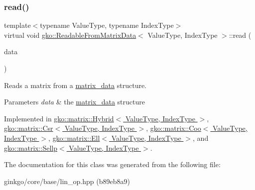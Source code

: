 \subsubsection{\texorpdfstring{read()}{read()}}
{\footnotesize\ttfamily template$<$typename Value\+Type, typename Index\+Type$>$ \\
virtual void \hyperlink{classgko_1_1ReadableFromMatrixData}{gko\+::\+Readable\+From\+Matrix\+Data}$<$ Value\+Type, Index\+Type $>$\+::read (\begin{DoxyParamCaption}\item[{const \hyperlink{structgko_1_1matrix__data}{matrix\+\_\+data}$<$ Value\+Type, Index\+Type $>$ \&}]{data }\end{DoxyParamCaption})\hspace{0.3cm}{\ttfamily [pure virtual]}}



Reads a matrix from a \hyperlink{structgko_1_1matrix__data}{matrix\+\_\+data} structure. 


\begin{DoxyParams}{Parameters}
{\em data} & the \hyperlink{structgko_1_1matrix__data}{matrix\+\_\+data} structure \\
\hline
\end{DoxyParams}


Implemented in \hyperlink{classgko_1_1matrix_1_1Hybrid_a7eff2922ae21e9722b343ca1832d8bf5}{gko\+::matrix\+::\+Hybrid$<$ Value\+Type, Index\+Type $>$}, \hyperlink{classgko_1_1matrix_1_1Csr_ac4db41146ed3c3a8653b03d6b2c6c675}{gko\+::matrix\+::\+Csr$<$ Value\+Type, Index\+Type $>$}, \hyperlink{classgko_1_1matrix_1_1Coo_ac0d4aeb19d9f55b62bea18bad1a408f5}{gko\+::matrix\+::\+Coo$<$ Value\+Type, Index\+Type $>$}, \hyperlink{classgko_1_1matrix_1_1Ell_a2c877d9f7bbc57f97df5ab443954a6fd}{gko\+::matrix\+::\+Ell$<$ Value\+Type, Index\+Type $>$}, and \hyperlink{classgko_1_1matrix_1_1Sellp_a2c5ff4a3f190daf7d70bbd8451d13edd}{gko\+::matrix\+::\+Sellp$<$ Value\+Type, Index\+Type $>$}.



The documentation for this class was generated from the following file\+:\begin{DoxyCompactItemize}
\item 
ginkgo/core/base/lin\+\_\+op.\+hpp (b89eb8a9)\end{DoxyCompactItemize}
